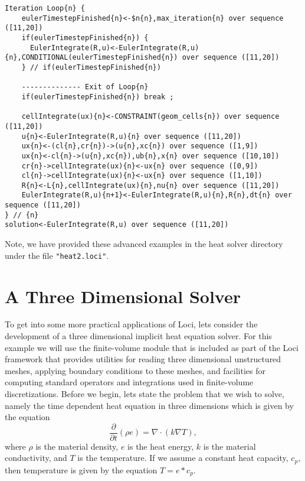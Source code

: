\documentclass[10pt,epsf,letterpaper,twoside]{book}
\begin{document}
\begin{verbatim}
Iteration Loop{n} {
    eulerTimestepFinished{n}<-$n{n},max_iteration{n} over sequence ([11,20])
    if(eulerTimestepFinished{n}) {
      EulerIntegrate(R,u)<-EulerIntegrate(R,u){n},CONDITIONAL(eulerTimestepFinished{n}) over sequence ([11,20])
    } // if(eulerTimestepFinished{n})

    -------------- Exit of Loop{n}
    if(eulerTimestepFinished{n}) break ;

    cellIntegrate(ux){n}<-CONSTRAINT(geom_cells{n}) over sequence ([11,20])
    u{n}<-EulerIntegrate(R,u){n} over sequence ([11,20])
    ux{n}<-(cl{n},cr{n})->(u{n},xc{n}) over sequence ([1,9])
    ux{n}<-cl{n}->(u{n},xc{n}),ub{n},x{n} over sequence ([10,10])
    cr{n}->cellIntegrate(ux){n}<-ux{n} over sequence ([0,9])
    cl{n}->cellIntegrate(ux){n}<-ux{n} over sequence ([1,10])
    R{n}<-L{n},cellIntegrate(ux){n},nu{n} over sequence ([11,20])
    EulerIntegrate(R,u){n+1}<-EulerIntegrate(R,u){n},R{n},dt{n} over sequence ([11,20])
} // {n}
solution<-EulerIntegrate(R,u) over sequence ([11,20])
\end{verbatim}

Note, we have provided these advanced examples in the heat solver
directory under the file {\tt "heat2.loci"}.



\chapter{A Three Dimensional Solver}

To get into some more practical applications of Loci, lets consider
the development of a three dimensional implicit heat equation solver.
For this example we will use the finite-volume module that is included
as part of the Loci framework that provides utilities for reading
three dimensional unstructured meshes, applying boundary conditions to
these meshes, and facilities for computing standard operators and
integrations used in finite-volume discretizations.  Before we begin,
lets state the problem that we wish to solve, namely the time
dependent heat equation in three dimensions which is given by the equation
\begin{equation}
\frac{\partial}{\partial t} (\rho e) = \nabla \cdot (k \nabla T),
\end{equation}
where $\rho$ is the material density, $e$ is the heat energy, $k$ is
the material conductivity, and $T$ is the temperature.  If we assume a
constant heat capacity, $c_p$, then temperature is given by the
equation $T=e*c_p$.
\end{document}
